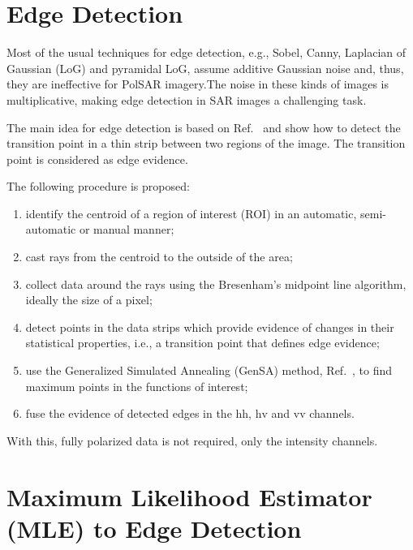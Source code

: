 \documentclass[conference]{IEEEtran}
\begin{document}
\section{Edge Detection}\label{sec_04}

Most of the usual techniques for edge detection, e.g., 
Sobel, Canny, Laplacian of Gaussian (LoG) and pyramidal LoG, assume additive Gaussian noise and, thus, they are ineffective for PolSAR imagery.The noise in these kinds of images is multiplicative, making edge detection in SAR images a challenging task.

The main idea for edge detection is based on Ref.~\cite{nhfc, gmbf} and show how to detect the transition point in a thin strip between two regions of the image. The transition point is considered as edge evidence. 

The following procedure is proposed:
\begin{enumerate}
	\item identify the centroid of a region of interest (ROI) in an automatic, semi-automatic or manual manner;
	\item cast rays from the centroid to the outside of the area;
	\item collect data around the rays using the  Bresenham's midpoint line algorithm, ideally the size of a pixel;
	\item detect points in the data strips which provide evidence of changes in their statistical properties, i.e., a transition point that defines edge evidence;
	\item use the Generalized Simulated Annealing (GenSA) method, Ref.~\cite{xgsh}, to find maximum points in the functions of interest;
	\item fuse the evidence of detected edges in the $\text{hh}$, $\text{hv}$ and $\text{vv}$ channels.
\end{enumerate}
With this, fully polarized data is not required, only the intensity channels.

\section{Maximum Likelihood Estimator (MLE) to Edge Detection}\label{sec_05}
\end{document}
